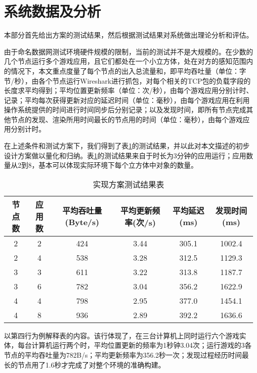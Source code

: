 \section{系统数据及分析}
\setcounter{subsubsection}{0}
\par
本部分首先给出方案的测试结果，然后根据测试结果对系统做出理论分析和评估。
\par
由于命名数据网测试环境硬件规模的限制，当前的测试并不是大规模的。在少数的几个节点运行多个游戏应用，且它们都处在一个小立方体，处在对方的感知范围内的情况下，本文重点度量了每个节点的出入总流量和，即平均吞吐量（单位：字节/秒），由各个节点运行Wireshark进行抓包，对每个相关的TCP包的负载字段的长度求平均得到；平均位置更新频率（单位：次/秒），由每个游戏应用分别计时、记录；平均每次获得更新对应的延迟时间（单位：毫秒），由每个游戏应用在利用操作系统提供的时间进行时间同步后分别记录；以及发现时间，即所有节点完成其他节点的发现、渲染所用时间最长的节点用的时间（单位：毫秒），由每个游戏应用分别计时。
\par
在上述条件和测试方案下，我们得到了表\ref{tab:preliminaryResults}的测试结果，并以此对本文描述的初步设计方案做以量化和归纳。表\ref{tab:preliminaryResults}的测试结果来自于时长为3分钟的应用运行；应用数量从2到8，基本可以体现实际环境下每个立方体中对象的数量。
\begin{table}[h!]
          \centering
          \caption{实现方案测试结果表}
          \label{tab:preliminaryResults}
          \wuhao
          \begin{tabular}{cccccc} \toprule 
          	节点数 & 应用数 & 平均吞吐量(Byte/s) & 平均更新频率(次/s) & 平均延迟(ms) & 发现时间(ms) \\ \midrule
           	2 &    2 &    424 &    3.44 &   305.1 &   1002.4 \\ 
		2 &    4 &    538 &    3.28 &   312.5 &   1129.3 \\
          	3 &    3 &    611 &    3.22 &   313.8 &   1187.7 \\ 
           	3 &    6 &    782 &    3.04 &   356.2 &   1622.9 \\
		4 &	 4 &	   798 &    2.95 &   377.0 &   1454.1 \\
		4 &	 8 &	   936 &    2.89 &   392.2 &   1636.6 \\
\bottomrule
          \end{tabular}
\end{table}
\par
以第四行为例解释表的内容。该行体现了，在三台计算机上同时运行六个游戏实体，每台计算机运行两个时，平均位置更新的频率为1秒钟3.04次；运行游戏的3各节点的平均吞吐量为782B/s；平均更新频率为356.2秒一次；发现过程经历时间最长的节点用了1.6秒才完成了对整个环境的准确构建。
